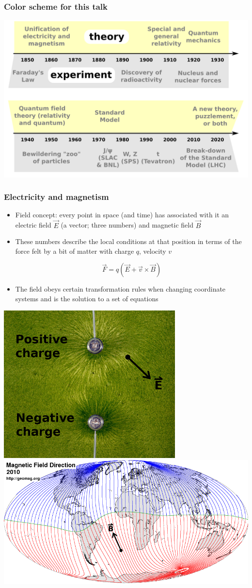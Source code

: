 \documentclass[compress]{beamer}
\begin{document}
\begin{frame}
\frametitle{Color scheme for this talk}
\includegraphics[width=\linewidth]{timeline4.png}
\end{frame}

\begin{frame}
\frametitle{Electricity and magnetism}

\begin{itemize}
\item Field concept: every point in space (and time) has associated
  with it an electric field $\vec{E}$ (a vector; three numbers) and
  magnetic field $\vec{B}$

\item These numbers describe the local conditions at that position in
  terms of the force felt by a bit of matter with charge $q$, velocity $v$

\[ \vec{F} = q \left(\vec{E} + \vec{v} \times \vec{B} \right) \]

\item The field obeys certain transformation rules when changing
  coordinate systems and is the solution to a set of equations

\end{itemize}

\includegraphics[height=3.4 cm]{electric_field_lines.jpg} \hfill
\includegraphics[height=3.4 cm]{magnetic_lines_2010.png}
\end{frame}
\end{document}
